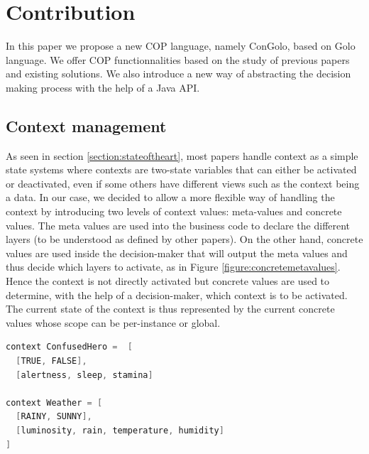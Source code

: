 \documentclass[a4paper]{article}
\begin{document}
  \section{Contribution}

\label{section:contribution}

In this paper we propose a new COP language, namely ConGolo, based on Golo language. We offer COP functionnalities based on the study of previous papers and existing solutions. We also introduce a new way of abstracting the decision making process with the help of a Java API.

\subsection{Context management}
\label{subsection:contextmanagement}

As seen in section \ref{section:stateoftheart}, most papers handle context as a simple state systems where contexts are two-state variables that can either be activated or deactivated, even if some others have different views such as the context being a data. In our case, we decided to allow a more flexible way of handling the context by introducing two levels of context values: meta-values and concrete values. The meta values are used into the business code to declare the different layers (to be understood as defined by other papers). On the other hand, concrete values are used inside the decision-maker that will output the meta values and thus decide which layers to activate, as in Figure \ref{figure:concretemetavalues}. Hence the context is not directly activated but concrete values are used to determine, with the help of a decision-maker, which context is to be activated. The current state of the context is thus represented by the current concrete values whose scope can be per-instance or global.

\begin{lstlisting}[float, language=Java, caption=ConGolo context example, label={listing:congolocontext}]
context ConfusedHero =  [
  [TRUE, FALSE],
  [alertness, sleep, stamina]

context Weather = [
  [RAINY, SUNNY],
  [luminosity, rain, temperature, humidity]
]
\end{lstlisting}
\end{document}
